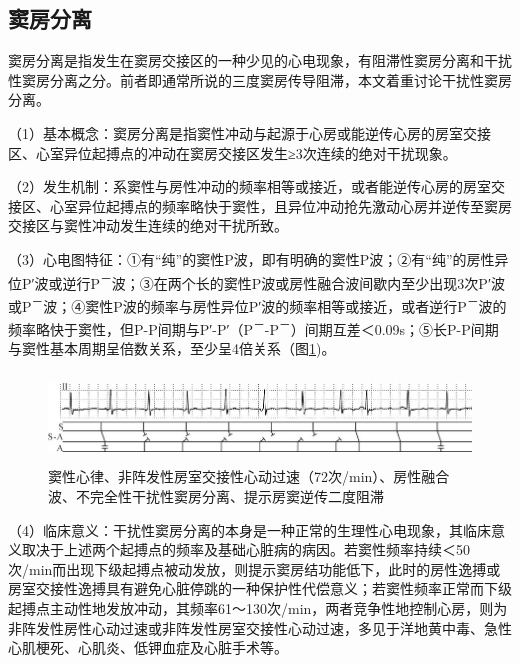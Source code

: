 \protect\hypertarget{text00037.htmlux5cux23subid431}{}{}

\subsection{窦房分离}

窦房分离是指发生在窦房交接区的一种少见的心电现象，有阻滞性窦房分离和干扰性窦房分离之分。前者即通常所说的三度窦房传导阻滞，本文着重讨论干扰性窦房分离。

（1）基本概念：窦房分离是指窦性冲动与起源于心房或能逆传心房的房室交接区、心室异位起搏点的冲动在窦房交接区发生≥3次连续的绝对干扰现象。

（2）发生机制：系窦性与房性冲动的频率相等或接近，或者能逆传心房的房室交接区、心室异位起搏点的频率略快于窦性，且异位冲动抢先激动心房并逆传至窦房交接区与窦性冲动发生连续的绝对干扰所致。

（3）心电图特征：①有“纯”的窦性P波，即有明确的窦性P波；②有“纯”的房性异位P′波或逆行P\textsuperscript{－}波；③在两个长的窦性P波或房性融合波间歇内至少出现3次P′波或P\textsuperscript{－}波；④窦性P波的频率与房性异位P′波的频率相等或接近，或者逆行P\textsuperscript{－}波的频率略快于窦性，但P-P间期与P′-P′（P\textsuperscript{－}-P\textsuperscript{－}）间期互差＜0.09s；⑤长P-P间期与窦性基本周期呈倍数关系，至少呈4倍关系（图\ref{fig30-1})。

\begin{figure}[!htbp]
 \centering
 \includegraphics[width=5.78125in,height=0.9375in]{./images/Image00496.jpg}
 \captionsetup{justification=centering}
 \caption{窦性心律、非阵发性房室交接性心动过速（72次/min）、房性融合波、不完全性干扰性窦房分离、提示房窦逆传二度阻滞}
 \label{fig30-1}
  \end{figure} 

（4）临床意义：干扰性窦房分离的本身是一种正常的生理性心电现象，其临床意义取决于上述两个起搏点的频率及基础心脏病的病因。若窦性频率持续＜50次/min而出现下级起搏点被动发放，则提示窦房结功能低下，此时的房性逸搏或房室交接性逸搏具有避免心脏停跳的一种保护性代偿意义；若窦性频率正常而下级起搏点主动性地发放冲动，其频率61～130次/min，两者竞争性地控制心房，则为非阵发性房性心动过速或非阵发性房室交接性心动过速，多见于洋地黄中毒、急性心肌梗死、心肌炎、低钾血症及心脏手术等。

\protect\hypertarget{text00037.htmlux5cux23subid432}{}{}

